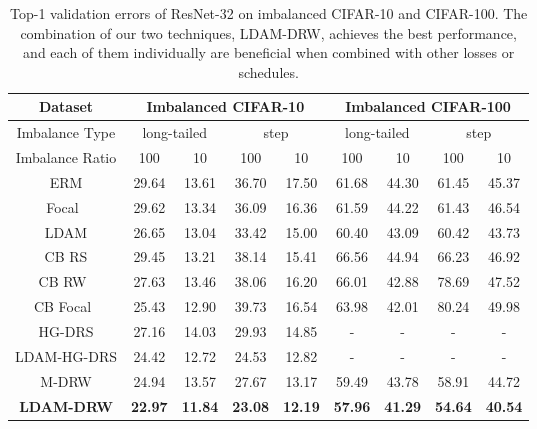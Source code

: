 \documentclass{article}
\newcommand{\BMHinge}{\textup{LDAM-HG}}
\newcommand{\ldam}{\textup{LDAM}}
\newcommand{\BMCE}{{\ldam}}
\newcommand{\tstagew}{DRW}
\newcommand{\tstages}{DRS}
\newcommand{\ERM}{ERM}
\begin{document}
\begin{table}[]
	\caption{Top-1 validation errors of ResNet-32 on imbalanced CIFAR-10 and CIFAR-100. The combination of our two techniques, \BMCE{}-\tstagew{}, achieves the best performance, and each of them individually are beneficial when combined with other losses or schedules.}
	\label{tab:margin-table}
	\centering
	\begin{tabular}{c|cc|cc|cc|cc}
		\toprule
		Dataset           & \multicolumn{4}{c|}{Imbalanced CIFAR-10}                               & \multicolumn{4}{c}{Imbalanced CIFAR-100}                              \\ \midrule
		Imbalance Type         & \multicolumn{2}{c|}{long-tailed} & \multicolumn{2}{c|}{step} & \multicolumn{2}{c|}{long-tailed} & \multicolumn{2}{c}{step} \\ \midrule
		Imbalance Ratio        & \multicolumn{1}{c|}{100}  & 10 & \multicolumn{1}{c|}{100}   & 10   & \multicolumn{1}{c|}{100}  & 10 & \multicolumn{1}{c|}{100}   & 10   \\ \midrule
		\ERM{} & 29.64& 13.61& 36.70 & 17.50 & 61.68& 44.30 & 61.45& 45.37 \\
		Focal~\citep{lin2017focal} & 29.62 & 13.34 & 36.09 & 16.36 & 61.59 & 44.22 &  61.43                 & 46.54 \\
		\BMCE{} & 26.65& 13.04& 33.42& 15.00  & 60.40 & 43.09& 60.42& 43.73 \\ 
		\midrule \midrule
		CB RS &  29.45  &  13.21 & 38.14 & 15.41  & 66.56& 44.94  & 66.23& 46.92 \\
	    CB RW~\citep{cui2019classbalancedloss} & 27.63& 13.46& 38.06 & 16.20 & 66.01& 42.88 & 78.69 & 47.52 \\
		CB Focal~\citep{cui2019classbalancedloss} & 25.43 & 12.90 & 39.73 & 16.54 & 63.98 & 42.01 & 80.24 & 49.98 \\
		\midrule
		HG-\tstages{}&  27.16 & 14.03 &   29.93  & 14.85 & - & - & - & - \\
		\BMHinge{}-\tstages{}& 24.42  & 12.72 & 24.53  & 12.82 & - & - & - & - \\
		M-\tstagew{}& 24.94 & 13.57 & 27.67 & 13.17 & 59.49  & 43.78 & 58.91 & 44.72\\
		\textbf{\BMCE{}-\tstagew{}}& \textbf{22.97}& \textbf{11.84}& \textbf{23.08}& \textbf{12.19}& \textbf{57.96}& \textbf{41.29}& \textbf{54.64}& \textbf{40.54} \\
		\bottomrule
	\end{tabular}
\end{table}
\end{document}
